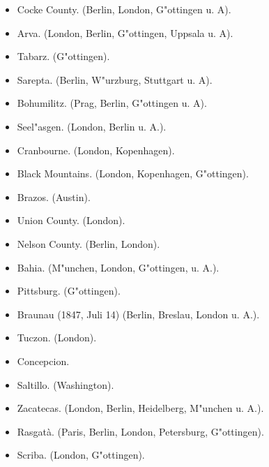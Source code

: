 \documentclass[a4paper, 11pt, oneside]{article}
\begin{document}
\begin{itemize}
\begin{itemize}
        \item Cocke County. (Berlin, London, G"ottingen u. A).
    
        \item Arva. (London, Berlin, G"ottingen, Uppsala u. A).
    
        \item Tabarz. (G"ottingen).
    
        \item Sarepta. (Berlin, W"urzburg, Stuttgart u. A).
    
        \item Bohumilitz. (Prag, Berlin, G"ottingen u. A).
    
        \item Seel"asgen. (London, Berlin u. A.).
    
        \item Cranbourne. (London, Kopenhagen).
    
        \item Black Mountains. (London, Kopenhagen, G"ottingen).
    
        \item Brazos. (Austin).
    
        \item Union County. (London).
    
        \item Nelson County. (Berlin, London).
    
        \item Bahia. (M"unchen, London, G"ottingen, u. A.).
    
        \item Pittsburg. (G"ottingen).
    
        \item Braunau (1847, Juli 14) (Berlin, Breslau, London u. A.).
    
        \item Tuczon. (London).
    
        \item Concepcion.
    
        \item Saltillo. (Washington).
    
        \item Zacatecas. (London, Berlin, Heidelberg, M"unchen u. A.).
    
        \item Rasgatà. (Paris, Berlin, London, Petersburg, G"ottingen).
    
        \item Scriba. (London, G"ottingen).
    

\end{itemize}
\end{itemize}
\end{document}
